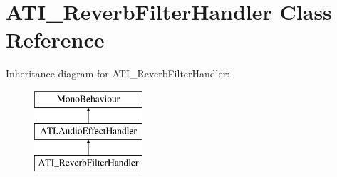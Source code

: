 \hypertarget{class_a_t_i___reverb_filter_handler}{}\section{A\+T\+I\+\_\+\+Reverb\+Filter\+Handler Class Reference}
\label{class_a_t_i___reverb_filter_handler}
Inheritance diagram for A\+T\+I\+\_\+\+Reverb\+Filter\+Handler\+:\begin{figure}[H]
\begin{center}
\leavevmode
\includegraphics[height=3.000000cm]{class_a_t_i___reverb_filter_handler}
\end{center}
\end{figure}
